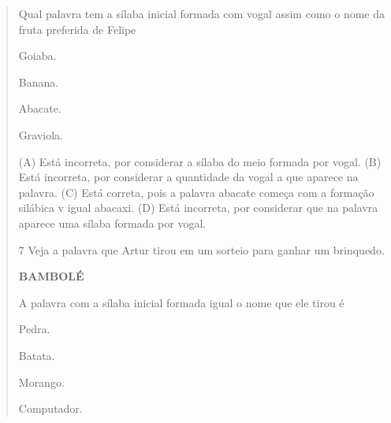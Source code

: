 \begin{verse}

Qual palavra tem a sílaba inicial formada com vogal assim como o nome da fruta preferida de Felipe

\begin{minipage}{.5\textwidth}
\begin{escolha}
\item Goiaba.

\item Banana.

\item Abacate.

\item Graviola.
\end{escolha}
\end{minipage}

(A) Está incorreta, por considerar a sílaba do meio formada por vogal.
(B) Está incorreta, por considerar a quantidade da vogal a que aparece
na palavra.
(C) Está correta, pois a palavra abacate começa com a formação silábica
v igual abacaxi.
(D) Está incorreta, por considerar que na palavra aparece uma sílaba
formada por vogal.

\num{7} Veja a palavra que Artur tirou em um sorteio para ganhar um brinquedo.

\textbf{BAMBOLÉ}

A palavra com a sílaba inicial formada igual o nome que ele tirou é

\begin{minipage}{.5\textwidth}
\begin{escolha}
\item Pedra.

\item Batata.

\item Morango.

\item Computador.
\end{escolha}
\end{minipage}


\end{verse}
